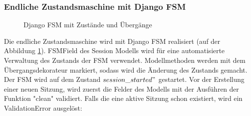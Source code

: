 \subsubsection{Endliche Zustandsmaschine mit Django FSM}
\label{sec:server:fsm:fsm}
\begin{figure}
	\centering
	\caption{Django FSM mit Zustände und Übergänge}
	\label{fig:django_fsm_trans}
\end{figure}
Die endliche Zustandsmaschine wird mit Django FSM realisiert (auf der Abbildung \ref{fig:django_fsm_trans}). FSMField des Session Modells wird für eine automatisierte Verwaltung des Zustands der FSM verwendet. Modellmethoden werden mit dem Übergangsdekorateur markiert, sodass wird die Änderung des Zustands gemacht. Der FSM wird auf dem Zustand $session\_started"$ gestartet. Vor der Erstellung einer neuen Sitzung, wird zuerst die Felder des Modells mit der Ausführen der Funktion "clean" validiert. Falls die eine aktive Sitzung schon existiert, wird ein ValidationError ausgelöst:


